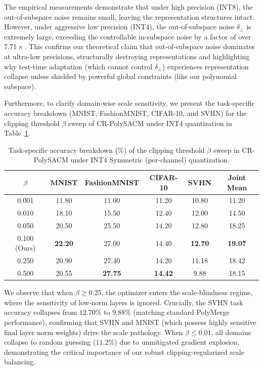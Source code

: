 \documentclass{article}
\theoremstyle{plain}
\theoremstyle{definition}
\theoremstyle{remark}
\begin{document}
The empirical measurements demonstrate that under high precision (INT8), the out-of-subspace noise remains small, leaving the representation structures intact. However, under aggressive low precision (INT4), the out-of-subspace noise $\delta_{\perp}$ is extremely large, exceeding the controllable in-subspace noise by a factor of over $7.71\times$. This confirms our theoretical claim that out-of-subspace noise dominates at ultra-low precisions, structurally destroying representations and highlighting why test-time adaptation (which cannot control $\delta_{\perp}$) experiences representation collapse unless shielded by powerful global constraints (like our polynomial subspace).

Furthermore, to clarify domain-wise scale sensitivity, we present the task-specific accuracy breakdown (MNIST, FashionMNIST, CIFAR-10, and SVHN) for the clipping threshold $\beta$ sweep of CR-PolySACM under INT4 quantization in Table~\ref{tab:task_beta_breakdown}.

\begin{table}[h]
\caption{Task-specific accuracy breakdown (\%) of the clipping threshold $\beta$ sweep in CR-PolySACM under INT4 Symmetric (per-channel) quantization.}
\label{tab:task_beta_breakdown}
\begin{center}
\begin{small}
\begin{sc}
\begin{tabular}{cccccc}
\toprule
$\beta$ & MNIST & FashionMNIST & CIFAR-10 & SVHN & Joint Mean \\
\midrule
0.001 & 11.80 & 11.00 & 11.20 & 10.80 & 11.20 \\
0.010 & 18.10 & 15.50 & 12.40 & 12.00 & 14.50 \\
0.050 & 20.50 & 25.50 & 14.20 & 12.80 & 18.25 \\
0.100 (Ours) & \textbf{22.20} & 27.00 & 14.40 & \textbf{12.70} & \textbf{19.07} \\
0.250 & 20.90 & 27.40 & 14.20 & 11.18 & 18.42 \\
0.500 & 20.55 & \textbf{27.75} & \textbf{14.42} & 9.88 & 18.15 \\
\bottomrule
\end{tabular}
\end{sc}
\end{small}
\end{center}
\end{table}

We observe that when $\beta \ge 0.25$, the optimizer enters the scale-blindness regime, where the sensitivity of low-norm layers is ignored. Crucially, the SVHN task accuracy collapses from $12.70\%$ to $9.88\%$ (matching standard PolyMerge performance), confirming that SVHN and MNIST (which possess highly sensitive final layer norm weights) drive the scale pathology. When $\beta \le 0.01$, all domains collapse to random guessing ($11.2\%$) due to unmitigated gradient explosion, demonstrating the critical importance of our robust clipping-regularized scale balancing.
\end{document}
